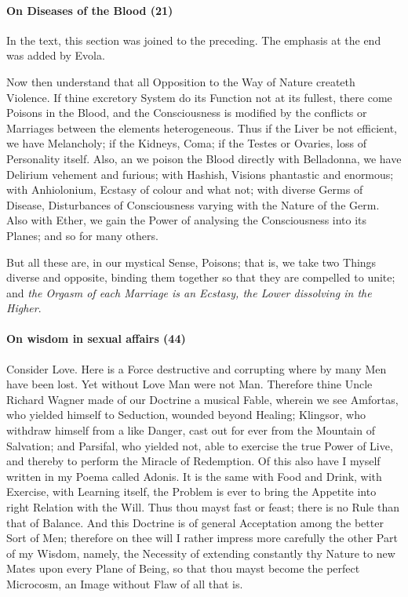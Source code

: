 \paragraph{On Diseases of the Blood (21)}


In the text, this section was joined to the preceding. The emphasis at the end was added by Evola.

Now then understand that all Opposition to the Way of Nature createth Violence. If thine excretory System do its Function not at its fullest, there come Poisons in the Blood, and the Consciousness is modified by the conflicts or Marriages between the elements heterogeneous. Thus if the Liver be not efficient, we have Melancholy; if the Kidneys, Coma; if the Testes or Ovaries, loss of Personality itself. Also, an we poison the Blood directly with Belladonna, we have Delirium vehement and furious; with Hashish, Visions phantastic and enormous; with Anhiolonium, Ecstasy of colour and what not; with diverse Germs of Disease, Disturbances of Consciousness varying with the Nature of the Germ. Also with Ether, we gain the Power of analysing the Consciousness into its Planes; and so for many others.

But all these are, in our mystical Sense, Poisons; that is, we take two Things diverse and opposite, binding them together so that they are compelled to unite; and \emph{the Orgasm of each Marriage is an Ecstasy, the Lower dissolving in the Higher}.

\paragraph{On wisdom in sexual affairs (44)}


Consider Love. Here is a Force destructive and corrupting where by many Men have been lost. Yet without Love Man were not Man. Therefore thine Uncle Richard Wagner made of our Doctrine a musical Fable, wherein we see Amfortas, who yielded himself to Seduction, wounded beyond Healing; Klingsor, who withdraw himself from a like Danger, cast out for ever from the Mountain of Salvation; and Parsifal, who yielded not, able to exercise the true Power of Live, and thereby to perform the Miracle of Redemption. Of this also have I myself written in my Poema called Adonis. It is the same with Food and Drink, with Exercise, with Learning itself, the Problem is ever to bring the Appetite into right Relation with the Will. Thus thou mayst fast or feast; there is no Rule than that of Balance. And this Doctrine is of general Acceptation among the better Sort of Men; therefore on thee will I rather impress more carefully the other Part of my Wisdom, namely, the Necessity of extending constantly thy Nature to new Mates upon every Plane of Being, so that thou mayst become the perfect Microcosm, an Image without Flaw of all that is.

